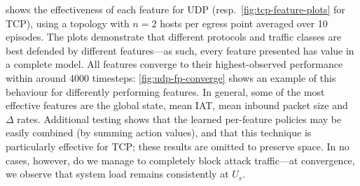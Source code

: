\documentclass[conference, letterpaper, 10pt, times]{IEEEtran}
\begin{document}
 shows the effectiveness of each feature for UDP (resp.\ \cref{fig:tcp-feature-plots} for TCP), using a topology with $n=2$ hosts per egress point averaged over 10 episodes.
The plots demonstrate that different protocols and traffic classes are best defended by different features---as such, every feature presented has value in a complete model.
All features converge to their highest-observed performance within around \num{4000} timesteps: \cref{fig:udp-fp-converge} shows an example of this behaviour for differently performing features.
In general, some of the most effective features are the global state, mean IAT, mean inbound packet size and $\Delta$ rates.
Additional testing shows that the learned per-feature policies may be easily combined (by summing action values), and that this technique is particularly effective for TCP; these results are omitted to preserve space.
In no cases, however, do we manage to completely block attack traffic---at convergence, we observe that system load remains consistently at $U_s$.
\end{document}
